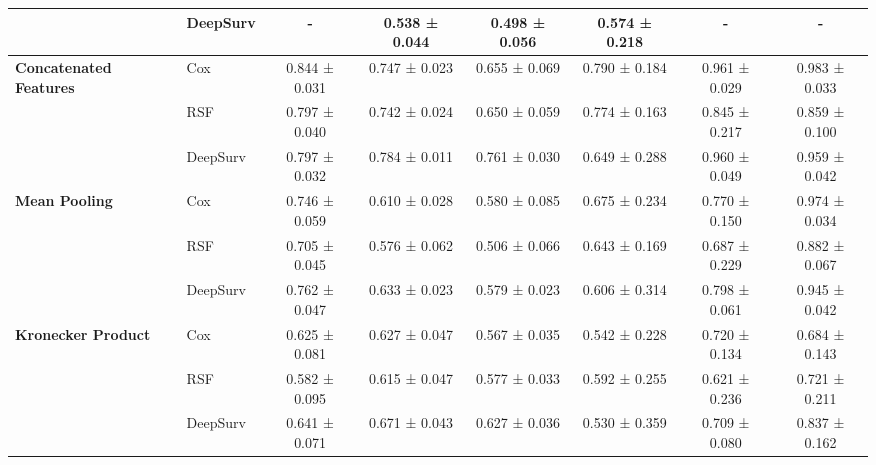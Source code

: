\begin{sidewaystable}[htbp]
\begin{tabular}{@{}llcccccc@{}}
        & DeepSurv & - & 0.538 ± 0.044 & 0.498 ± 0.056 & 0.574 ± 0.218 & - & - \\
        \midrule
        \multirow{3}{*}{\textbf{Concatenated Features}} & Cox & 0.844 ± 0.031 & 0.747 ± 0.023 & 0.655 ± 0.069 & 0.790 ± 0.184 & 0.961 ± 0.029 & 0.983 ± 0.033 \\
        & RSF & 0.797 ± 0.040 & 0.742 ± 0.024 & 0.650 ± 0.059 & 0.774 ± 0.163 & 0.845 ± 0.217 & 0.859 ± 0.100 \\
        & DeepSurv & 0.797 ± 0.032 & 0.784 ± 0.011 & 0.761 ± 0.030 & 0.649 ± 0.288 & 0.960 ± 0.049 & 0.959 ± 0.042 \\
        \midrule
        \multirow{3}{*}{\textbf{Mean Pooling}} & Cox & 0.746 ± 0.059 & 0.610 ± 0.028 & 0.580 ± 0.085 & 0.675 ± 0.234 & 0.770 ± 0.150 & 0.974 ± 0.034 \\
        & RSF & 0.705 ± 0.045 & 0.576 ± 0.062 & 0.506 ± 0.066 & 0.643 ± 0.169 & 0.687 ± 0.229 & 0.882 ± 0.067 \\
        & DeepSurv & 0.762 ± 0.047 & 0.633 ± 0.023 & 0.579 ± 0.023 & 0.606 ± 0.314 & 0.798 ± 0.061 & 0.945 ± 0.042 \\
        \midrule
        \multirow{3}{*}{\textbf{Kronecker Product}} & Cox & 0.625 ± 0.081 & 0.627 ± 0.047 & 0.567 ± 0.035 & 0.542 ± 0.228 & 0.720 ± 0.134 & 0.684 ± 0.143 \\
        & RSF & 0.582 ± 0.095 & 0.615 ± 0.047 & 0.577 ± 0.033 & 0.592 ± 0.255 & 0.621 ± 0.236 & 0.721 ± 0.211 \\
        & DeepSurv & 0.641 ± 0.071 & 0.671 ± 0.043 & 0.627 ± 0.036 & 0.530 ± 0.359 & 0.709 ± 0.080 & 0.837 ± 0.162 \\
        \bottomrule
    \end{tabular}
\end{sidewaystable}